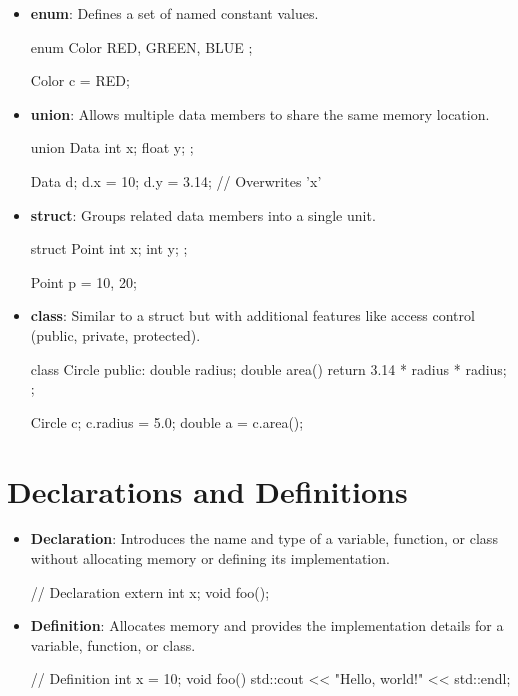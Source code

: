 \begin{itemize}
    \item \textbf{enum}: Defines a set of named constant values.
    \begin{codeblock}[language=C++]
enum Color { RED, GREEN, BLUE };

Color c = RED;
    \end{codeblock}
    \item \textbf{union}: Allows multiple data members to share the same memory location.
    \begin{codeblock}[language=C++]
union Data {
    int x;
    float y;
};

Data d;
d.x = 10;
d.y = 3.14; // Overwrites 'x'
    \end{codeblock}
    \item \textbf{struct}: Groups related data members into a single unit.
    \begin{codeblock}[language=C++]
struct Point {
    int x;
    int y;
};

Point p = {10, 20};
    \end{codeblock}
    \item \textbf{class}: Similar to a struct but with additional features like access control (public, private, protected).
    \begin{codeblock}[language=C++]
class Circle {
public:
    double radius;
    double area() {
        return 3.14 * radius * radius;
    }
};

Circle c;
c.radius = 5.0;
double a = c.area();
    \end{codeblock}
\end{itemize}



\section{Declarations and Definitions}

\begin{itemize}
    \item \textbf{Declaration}: Introduces the name and type of a variable, function, or class without allocating memory or defining its implementation.
\begin{codeblock}[language=C++, numbers=none]
// Declaration
extern int x;
void foo();
\end{codeblock}
    \item \textbf{Definition}: Allocates memory and provides the implementation details for a variable, function, or class.
\begin{codeblock}[language=C++, numbers=none]
// Definition
int x = 10;
void foo() {
    std::cout << "Hello, world!" << std::endl;
}
\end{codeblock}
\end{itemize}


